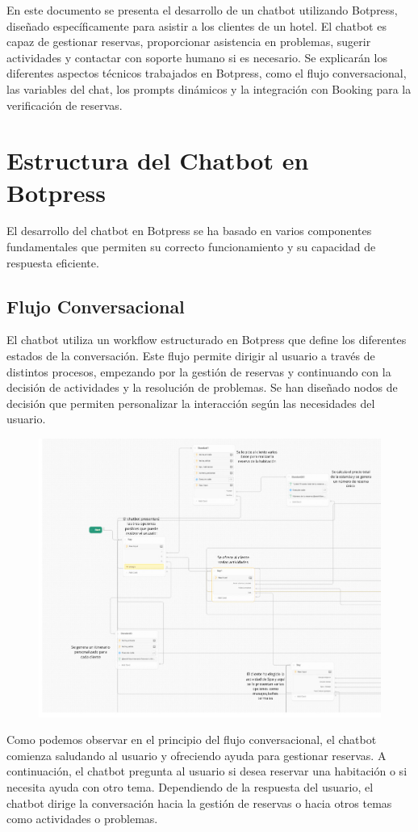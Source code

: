 \documentclass[12pt]{article}
\begin{document}
En este documento se presenta el desarrollo de un chatbot utilizando Botpress, diseñado específicamente para asistir a los clientes de un 
hotel. El chatbot es capaz de gestionar reservas, proporcionar asistencia en problemas, sugerir actividades y contactar con soporte humano 
si es necesario. Se explicarán los diferentes aspectos técnicos trabajados en Botpress, como el flujo conversacional, 
las variables del chat, los prompts dinámicos y la integración con Booking para la verificación de reservas.

\section{Estructura del Chatbot en Botpress}

El desarrollo del chatbot en Botpress se ha basado en varios componentes fundamentales que permiten su correcto funcionamiento y su capacidad de 
respuesta eficiente.

\subsection{Flujo Conversacional}

El chatbot utiliza un workflow estructurado en Botpress que define los diferentes estados de la conversación. Este flujo permite dirigir al usuario 
a través de distintos procesos, empezando por la gestión de reservas y continuando con la decisión de actividades y la resolución de problemas.
Se han diseñado nodos de decisión que permiten personalizar la interacción según las necesidades del usuario.

\begin{figure}[h!]
    \centering
    \includegraphics[width=.5\textwidth]{assets/workflow1.jpeg}
    \label{fig:my_label}
\end{figure}

Como podemos observar en el principio del flujo conversacional, el chatbot comienza saludando al usuario y ofreciendo ayuda para gestionar reservas.
A continuación, el chatbot pregunta al usuario si desea reservar una habitación o si necesita ayuda con otro tema. Dependiendo de la respuesta del usuario,
el chatbot dirige la conversación hacia la gestión de reservas o hacia otros temas como actividades o problemas.
\end{document}
